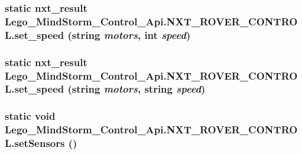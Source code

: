 \hypertarget{class_lego___mind_storm___control___api_1_1_n_x_t___r_o_v_e_r___c_o_n_t_r_o_l_d575f3c6f89bad772dda191101f98d35}{
\subsubsection[{set\_\-speed}]{\setlength{\rightskip}{0pt plus 5cm}static {\bf nxt\_\-result} Lego\_\-MindStorm\_\-Control\_\-Api.NXT\_\-ROVER\_\-CONTROL.set\_\-speed (string {\em motors}, \/  int {\em speed})}}
\label{class_lego___mind_storm___control___api_1_1_n_x_t___r_o_v_e_r___c_o_n_t_r_o_l_d575f3c6f89bad772dda191101f98d35}


\hypertarget{class_lego___mind_storm___control___api_1_1_n_x_t___r_o_v_e_r___c_o_n_t_r_o_l_9bfbb189dc1f7507bc9caadfeb5d6ab4}{
\subsubsection[{set\_\-speed}]{\setlength{\rightskip}{0pt plus 5cm}static {\bf nxt\_\-result} Lego\_\-MindStorm\_\-Control\_\-Api.NXT\_\-ROVER\_\-CONTROL.set\_\-speed (string {\em motors}, \/  string {\em speed})}}
\label{class_lego___mind_storm___control___api_1_1_n_x_t___r_o_v_e_r___c_o_n_t_r_o_l_9bfbb189dc1f7507bc9caadfeb5d6ab4}


\hypertarget{class_lego___mind_storm___control___api_1_1_n_x_t___r_o_v_e_r___c_o_n_t_r_o_l_ca629fd05b17b54a9881893caece96b4}{
\subsubsection[{setSensors}]{\setlength{\rightskip}{0pt plus 5cm}static void Lego\_\-MindStorm\_\-Control\_\-Api.NXT\_\-ROVER\_\-CONTROL.setSensors ()}}
\label{class_lego___mind_storm___control___api_1_1_n_x_t___r_o_v_e_r___c_o_n_t_r_o_l_ca629fd05b17b54a9881893caece96b4}



